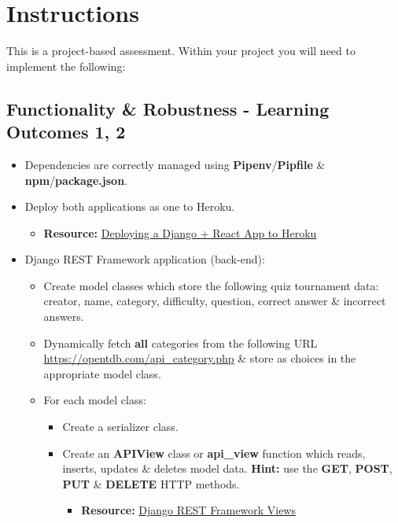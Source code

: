 \documentclass{article}
\begin{document}
\newpage

\section*{Instructions} 
This is a project-based assessment. Within your project you will need to implement the following:

\subsection*{Functionality \& Robustness - Learning Outcomes 1, 2}
\begin{itemize}
	\item Dependencies are correctly managed using \textbf{Pipenv}/\textbf{Pipfile} \& \textbf{npm}/\textbf{package.json}.
	\item Deploy both applications as one to Heroku.
	\begin{itemize}
		\item \textbf{Resource:} \href{https://dev.to/shakib609/deploy-your-django-react-js-app-to-heroku-2bck}{Deploying a Django + React App to Heroku}
	\end{itemize}
	\item Django REST Framework application (back-end):
	\begin{itemize}
		\item Create model classes which store the following quiz tournament data: creator, name, category, difficulty, question, correct answer \& incorrect answers. 
		\item Dynamically fetch \textbf{all} categories from the following URL \href{https://opentdb.com/api\_category.php}{https://opentdb.com/api\_category.php} \& store as choices in the appropriate model class.
		\item For each model class:
		\begin{itemize}
			\item Create a serializer class. 
			\item Create an \textbf{APIView} class or \textbf{api\_view} function which reads, inserts, updates \& deletes model data. \textbf{Hint:} use the \textbf{GET}, \textbf{POST}, \textbf{PUT} \& \textbf{DELETE} HTTP methods.
			\begin{itemize}
				\item \textbf{Resource:} \href{https://www.django-rest-framework.org/api-guide/views}{Django REST Framework Views}
			\end{itemize}
		\end{itemize} 

\end{itemize}
\end{itemize}
\end{document}
